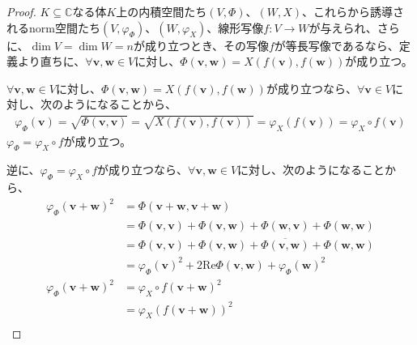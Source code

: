 \documentclass[dvipdfmx]{jsarticle}
\begin{document}
\begin{proof}
$K \subseteq \mathbb{C}$なる体$K$上の内積空間たち$(V,\varPhi )$、$(W,X)$、これらから誘導されるnorm空間たち$\left( V,\varphi_{\varPhi } \right)$、$\left( W,\varphi_{X} \right)$、線形写像$f:V \rightarrow W$が与えられ、さらに、$\dim V = \dim W = n$が成り立つとき、その写像$f$が等長写像であるなら、定義より直ちに、$\forall\mathbf{v},\mathbf{w} \in V$に対し、$\varPhi \left( \mathbf{v},\mathbf{w} \right) = X\left( f\left( \mathbf{v} \right),f\left( \mathbf{w} \right) \right)$が成り立つ。\par
$\forall\mathbf{v},\mathbf{w} \in V$に対し、$\varPhi \left( \mathbf{v},\mathbf{w} \right) = X\left( f\left( \mathbf{v} \right),f\left( \mathbf{w} \right) \right)$が成り立つなら、$\forall\mathbf{v} \in V$に対し、次のようになることから、
\begin{align*}
\varphi_{\varPhi }\left( \mathbf{v} \right) = \sqrt{\varPhi \left( \mathbf{v},\mathbf{v} \right)} = \sqrt{X\left( f\left( \mathbf{v} \right),f\left( \mathbf{v} \right) \right)} = \varphi_{X}\left( f\left( \mathbf{v} \right) \right) = \varphi_{X} \circ f\left( \mathbf{v} \right)
\end{align*}
$\varphi_{\varPhi } = \varphi_{X} \circ f$が成り立つ。\par
逆に、$\varphi_{\varPhi } = \varphi_{X} \circ f$が成り立つなら、$\forall\mathbf{v},\mathbf{w} \in V$に対し、次のようになることから、
\begin{align*}
{\varphi_{\varPhi }\left( \mathbf{v} + \mathbf{w} \right)}^{2} &= \varPhi \left( \mathbf{v} + \mathbf{w},\mathbf{v} + \mathbf{w} \right)\\
&= \varPhi \left( \mathbf{v},\mathbf{v} \right) + \varPhi \left( \mathbf{v},\mathbf{w} \right) + \varPhi \left( \mathbf{w},\mathbf{v} \right) + \varPhi \left( \mathbf{w},\mathbf{w} \right)\\
&= \varPhi \left( \mathbf{v},\mathbf{v} \right) + \varPhi \left( \mathbf{v},\mathbf{w} \right) + \overline{\varPhi \left( \mathbf{v},\mathbf{w} \right)} + \varPhi \left( \mathbf{w},\mathbf{w} \right)\\
&= {\varphi_{\varPhi }\left( \mathbf{v} \right)}^{2} + 2\mathrm{Re}{\varPhi \left( \mathbf{v},\mathbf{w} \right)} + {\varphi_{\varPhi }\left( \mathbf{w} \right)}^{2}\\
{\varphi_{\varPhi }\left( \mathbf{v} + \mathbf{w} \right)}^{2} &= {\varphi_{X} \circ f\left( \mathbf{v} + \mathbf{w} \right)}^{2}\\
&= {\varphi_{X}\left( f\left( \mathbf{v} + \mathbf{w} \right) \right)}^{2}\\

\end{align*}
\end{proof}
\end{document}
